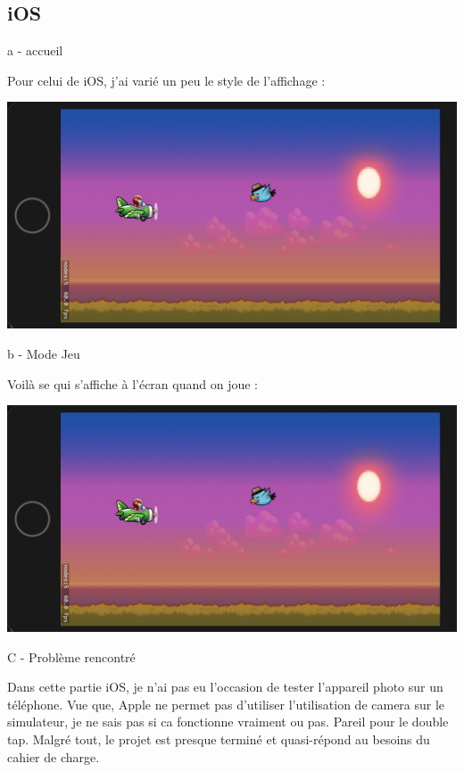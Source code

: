 \documentclass{rapportECL}
\begin{document}
\newpage
\subsection{iOS}
a - accueil

Pour celui de iOS, j'ai varié un peu le style de l'affichage : 

\begin{center}
    \includegraphics[scale = 0.5]{logos/JeuiOS.png}
\end{center}

b - Mode Jeu

Voilà se qui s'affiche à l'écran quand on joue : 

\begin{center}
    \includegraphics[scale = 0.5]{logos/JeuiOS.png}
\end{center}

C - Problème rencontré

Dans cette partie iOS, je n'ai pas eu l'occasion de tester l'appareil photo sur un téléphone. Vue que, Apple ne permet pas d'utiliser l'utilisation de camera sur le simulateur, je ne sais pas si ca fonctionne vraiment ou pas. Pareil pour le double tap. Malgré tout, le projet est presque terminé et quasi-répond au besoins du cahier de charge.
\end{document}
